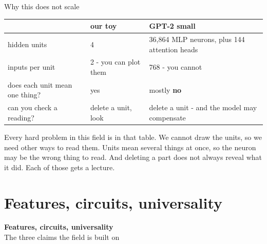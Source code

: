 \documentclass[aspectratio=169]{beamer}
\newcommand{\watchbox}[1]{%
  \begin{tcolorbox}[colback=armorange!12, colframe=armorange, boxrule=0.6pt, arc=2pt]
  #1
  \end{tcolorbox}}
\newcommand{\sectiontransition}[2]{%
  \begin{frame}[plain]
    \vfill
    \begin{center}
      {\Huge\bfseries\color{popblue} #1}\\[1.1em]
      {\large #2}
    \end{center}
    \vfill
  \end{frame}}
\begin{document}
\begin{frame}{Why this does not scale}
  \vspace{0.4em}
  \begin{center}
  \small
  \begin{tabular}{@{}p{}p{}p{}@{}}
    \toprule
    & \textbf{our toy} & \textbf{GPT-2 small}\\
    \midrule
    hidden units & 4 & 36{,}864 MLP neurons, plus 144 attention heads\\[0.3em]
    inputs per unit & 2 - you can plot them & 768 - you cannot\\[0.3em]
    does each unit mean one thing? & yes & mostly \textbf{no}\\[0.3em]
    can you check a reading? & delete a unit, look & delete a unit - and the model may
      compensate\\
    \bottomrule
  \end{tabular}
  \end{center}

  \vspace{0.8em}
  \watchbox{Every hard problem in this field is in that table. We cannot draw the units, so we need
  other ways to read them. Units mean several things at once, so the neuron may be the wrong thing
  to read. And deleting a part does not always reveal what it did. Each of those gets a lecture.}
\end{frame}

\section{Features, circuits, universality}
\sectiontransition{Features, circuits, universality}{The three claims the field is built on}
\end{document}
